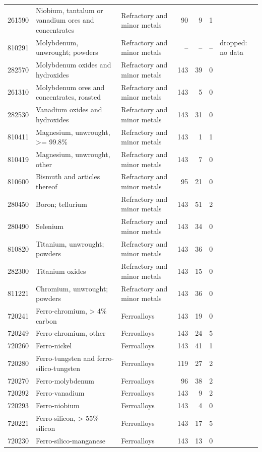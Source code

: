\begin{minipage}{\linewidth}
\begin{tabular}{llp{3.2cm}rrrl}
261590 & Niobium, tantalum or vanadium ores and concentrates & Refractory and minor metals & 90 & 9 & 1 &  \\
810291 & Molybdenum, unwrought; powders & Refractory and minor metals & -- & -- & -- & dropped: no data \\
282570 & Molybdenum oxides and hydroxides & Refractory and minor metals & 143 & 39 & 0 &  \\
261310 & Molybdenum ores and concentrates, roasted & Refractory and minor metals & 143 & 5 & 0 &  \\
282530 & Vanadium oxides and hydroxides & Refractory and minor metals & 143 & 31 & 0 &  \\
810411 & Magnesium, unwrought, >= 99.8\% & Refractory and minor metals & 143 & 1 & 1 &  \\
810419 & Magnesium, unwrought, other & Refractory and minor metals & 143 & 7 & 0 &  \\
810600 & Bismuth and articles thereof & Refractory and minor metals & 95 & 21 & 0 &  \\
280450 & Boron; tellurium & Refractory and minor metals & 143 & 51 & 2 &  \\
280490 & Selenium & Refractory and minor metals & 143 & 34 & 0 &  \\
810820 & Titanium, unwrought; powders & Refractory and minor metals & 143 & 36 & 0 &  \\
282300 & Titanium oxides & Refractory and minor metals & 143 & 15 & 0 &  \\
811221 & Chromium, unwrought; powders & Refractory and minor metals & 143 & 36 & 0 &  \\
720241 & Ferro-chromium, > 4\% carbon & Ferroalloys & 143 & 19 & 0 &  \\
720249 & Ferro-chromium, other & Ferroalloys & 143 & 24 & 5 &  \\
720260 & Ferro-nickel & Ferroalloys & 143 & 41 & 1 &  \\
720280 & Ferro-tungsten and ferro-silico-tungsten & Ferroalloys & 119 & 27 & 2 &  \\
720270 & Ferro-molybdenum & Ferroalloys & 96 & 38 & 2 &  \\
720292 & Ferro-vanadium & Ferroalloys & 143 & 9 & 2 &  \\
720293 & Ferro-niobium & Ferroalloys & 143 & 4 & 0 &  \\
720221 & Ferro-silicon, > 55\% silicon & Ferroalloys & 143 & 17 & 5 &  \\
720230 & Ferro-silico-manganese & Ferroalloys & 143 & 13 & 0 &  \\

\end{tabular}
\end{minipage}

